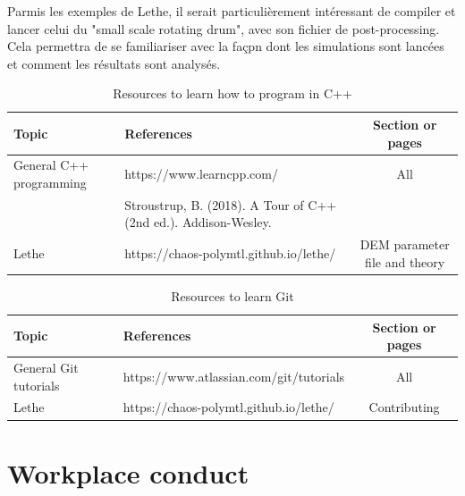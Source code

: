 \documentclass[12pt]{article}
\newcounter{theo}[section]\setcounter{theo}{0}
\begin{document}
Parmis les exemples de Lethe, il serait particulièrement intéressant de compiler et lancer celui du "small scale rotating drum", avec son fichier de post-processing. Cela permettra de se familiariser avec la façpn dont les simulations sont lancées et comment les résultats sont analysés.

\begin{center}
  \begin{table}[h]
    \caption{Resources to learn how to program in C++}
    \centering
    \begin{tabular}{p{3cm}|p{8cm}|c}
      Topic                   & References                                      & Section or pages              \\
      \hline
      \hline
      General C++ programming & https://www.learncpp.com/                       & All                           \\
                              & Stroustrup, B. (2018). A Tour of C++ (2nd ed.).
      Addison-Wesley.                                                                                           \\
      \hline
      Lethe                   & https://chaos-polymtl.github.io/lethe/          & DEM parameter file and theory \\
    \end{tabular}
  \end{table}
\end{center}

\begin{center}
  \begin{table}[h]
    \caption{Resources to learn Git}
    \centering
    \begin{tabular}{p{3cm}|p{9cm}|c}
      Topic                 & References                              & Section or pages \\
      \hline
      \hline
      General Git tutorials & https://www.atlassian.com/git/tutorials & All              \\
      \hline
      Lethe                 & https://chaos-polymtl.github.io/lethe/  & Contributing     \\
    \end{tabular}
  \end{table}
\end{center}


\section{Workplace conduct}
\end{document}
